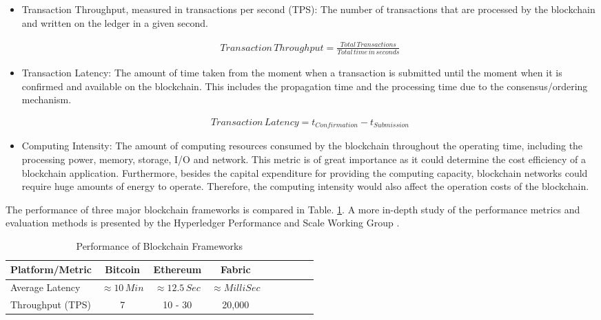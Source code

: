 \begin{itemize}
    \item Transaction Throughput, measured in transactions per second (TPS):
    The number of transactions that are processed by the blockchain and written on the ledger in a given second.
    
    \begin{equation} \label{eq1}
    \begin{split}
    Transaction\,Throughput = \frac{Total\,Transactions}{Total\,time\,in\,seconds}
    \end{split}
    \end{equation}

    \item Transaction Latency:
    The amount of time taken from the moment when a transaction is submitted until the moment when it is confirmed and available on the blockchain. This includes the propagation time and the processing time due to the consensus/ordering mechanism.
    
    \begin{equation} \label{eq2}
    \begin{split}
    Transaction\,Latency = t_{Confirmation} - t_{Submission}
    \end{split}
    \end{equation}


    \item Computing Intensity:
    The amount of computing resources consumed by the blockchain throughout the operating time, including the processing power, memory, storage, I/O and network. This metric is of great importance as it could determine the cost efficiency of a blockchain application. Furthermore, besides the capital expenditure for providing the computing capacity, blockchain networks could require huge amounts of energy to operate. Therefore, the computing intensity would also affect the operation costs of the blockchain.
    

\end{itemize}


The performance of three major blockchain frameworks is compared in Table. \ref{tab:bc-perform}.
A more in-depth study of the performance metrics and evaluation methods is presented by the Hyperledger Performance and Scale Working Group  \cite{hgperf,pswg}.

\begin{table}[htbp]
  \caption{Performance of Blockchain Frameworks} 
  \label{tab:bc-perform}
  \small %
  \centering %
  \begin{tabular}{lcccccccr} %
  \toprule[\heavyrulewidth]\toprule[\heavyrulewidth]
  Platform/Metric & Bitcoin    & Ethereum     &  Fabric \\ \hline
  \midrule
    Average Latency  & $\approx 10\, Min$ & $\approx 12.5\, Sec$ & $\approx MilliSec$      \\
    Throughput (TPS) & 7   & 10 - 30    & 20,000 \cite{Gorenflo_2019}          \\
  \bottomrule[\heavyrulewidth] 
  \end{tabular}
\end{table}



